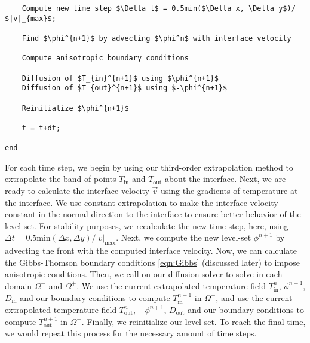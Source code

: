 \documentclass[oneside,12pt,final]{/Applications/TeX/packages/ucthesis-CA2012}
\begin{document}
\begin{mainmatter}
\begin{lstlisting}
    Compute new time step $\Delta t$ = 0.5min($\Delta x, \Delta y$)/ $|v|_{max}$;   

    Find $\phi^{n+1}$ by advecting $\phi^n$ with interface velocity
    
    Compute anisotropic boundary conditions
    
    Diffusion of $T_{in}^{n+1}$ using $\phi^{n+1}$
    Diffusion of $T_{out}^{n+1}$ using $-\phi^{n+1}$
    
    Reinitialize $\phi^{n+1}$
    
    t = t+dt;
    
end
\end{lstlisting}

\dsp

For each time step, we begin by using our third-order extrapolation method to extrapolate the band of points $T_\text{in}$ and $T_\text{out}$ about the interface. Next, we are ready to calculate the interface velocity $\vec{v}$ using the gradients of temperature at the interface. We use constant extrapolation to make the interface velocity constant in the normal direction to the interface to ensure better behavior of the level-set. For stability purposes, we recalculate the new time step, here, using $\Delta t = 0.5 \text{min}(\Delta x,\Delta y)/|v|_{\text{max}}$. Next, we compute the new level-set $\phi^{n+1}$ by advecting the front with the computed interface velocity. Now, we can calculate the Gibbs-Thomson boundary conditions \eqref{eqn:Gibbs} (discussed later) to impose anisotropic conditions. Then, we call on our diffusion solver to solve in each domain $\Omega^-$ and $\Omega^+$. We use the current extrapolated temperature field $T_\text{in}^n$, $\phi^{n+1}$, $D_\text{in}$ and our boundary conditions to compute $T_\text{in}^{n+1}$ in $\Omega^-$, and use the current extrapolated temperature field $T_\text{out}^n$, $-\phi^{n+1}$, $D_\text{out}$ and our boundary conditions to compute $T_\text{out}^{n+1}$ in $\Omega^+$. Finally, we reinitialize our level-set. To reach the final time, we would repeat this process for the necessary amount of time steps.


\end{mainmatter}
\end{document}
